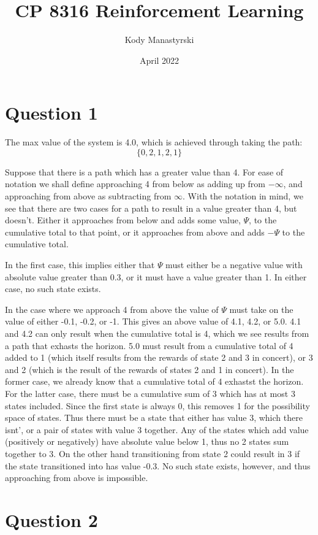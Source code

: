\documentclass{article}
\author{Kody Manastyrski}
\title{CP 8316 Reinforcement Learning}
\date{April 2022}
\begin{document}
\maketitle

\section{Question 1}
The max value of the system is 4.0, which is achieved through taking the path:
\[\{0, 2, 1, 2, 1\}\]

Suppose that there is a path which has a greater value than 4. 
For ease of notation we shall define approaching 4 from below as adding up from
$-\infty$, and approaching from above as subtracting from $\infty$. 
With the notation in mind, we see that there are two cases for a path to result
in a value greater than 4, but doesn't.
Either it approaches from below and adds some value,
$\Psi$, to the cumulative total to that point, or it approaches from above and
adds $-\Psi$ to the cumulative total.

In the first case, this implies either 
that $\Psi$ must either be a negative value with absolute value greater than 0.3,
or it must have a value greater than 1.
In either case, no such state exists. 

In the case where we approach 4 from above the value of $\Psi$ must take on the
value of either -0.1, -0.2, or -1.
This gives an above value of 4.1, 4.2, or 5.0. 
4.1 and 4.2 can only result when the cumulative total is 4, which we see results from 
a path that exhasts the horizon.
5.0 must result from a cumulative total of 4 added to 1 
(which itself results from the rewards of state 2 and 3 in concert), or 3 and 2 
(which is the result of the rewards of states 2 and 1 in concert).
In the former case, we already know that a cumulative total of 4 exhastst the  horizon.
For the latter case, there must be a cumulative sum of 3 which has at most 3 states included.
Since the first state is always 0, this removes 1 for the possibility space of states.
Thus there must be a state that either has value 3, which there isnt', or a pair of states
with value 3 together. 
Any of the states which add value (positively or negatively) have absolute value below 1, 
thus no 2 states sum together to 3. 
On the other hand transitioning from state 2 could result in 3 if the state transitioned
into has value -0.3. 
No such state exists, however, and thus approaching from above is impossible.

\section{Question 2}
\end{document}

